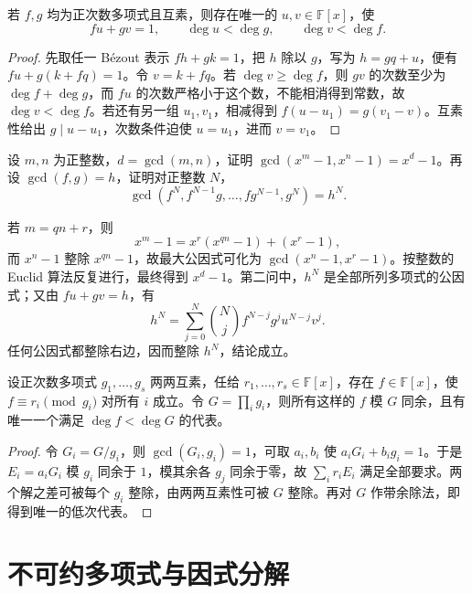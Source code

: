 \begin{proposition}
\label{prop:poly-reduced-bezout}
若 $f,g$ 均为正次数多项式且互素，则存在唯一的 $u,v\in\mathbb F[x]$，使
\[
    fu+gv=1,\qquad \deg u<\deg g,\qquad \deg v<\deg f.
\]
\end{proposition}
\begin{proof}
先取任一 Bézout 表示 $fh+gk=1$，把 $h$ 除以 $g$，写为 $h=gq+u$，便有 $fu+g(k+fq)=1$。令 $v=k+fq$。若 $\deg v\geq\deg f$，则 $gv$ 的次数至少为 $\deg f+\deg g$，而 $fu$ 的次数严格小于这个数，不能相消得到常数，故 $\deg v<\deg f$。若还有另一组 $u_1,v_1$，相减得到 $f(u-u_1)=g(v_1-v)$。互素性给出 $g\mid u-u_1$，次数条件迫使 $u=u_1$，进而 $v=v_1$。
\end{proof}

\begin{example}
\label{ex:poly-gcd-powers}
设 $m,n$ 为正整数，$d=\gcd(m,n)$，证明 $\gcd(x^m-1,x^n-1)=x^d-1$。再设 $\gcd(f,g)=h$，证明对正整数 $N$，
\[
    \gcd(f^N,f^{N-1}g,\ldots,fg^{N-1},g^N)=h^N.
\]
\end{example}
\begin{solve}
若 $m=qn+r$，则
\[
    x^m-1=x^r(x^{qn}-1)+(x^r-1),
\]
而 $x^n-1$ 整除 $x^{qn}-1$，故最大公因式可化为 $\gcd(x^n-1,x^r-1)$。按整数的 Euclid 算法反复进行，最终得到 $x^d-1$。第二问中，$h^N$ 是全部所列多项式的公因式；又由 $fu+gv=h$，有
\[
    h^N=\sum_{j=0}^N\binom Nj f^{N-j}g^ju^{N-j}v^j.
\]
任何公因式都整除右边，因而整除 $h^N$，结论成立。
\end{solve}

\begin{theorem}[多项式的中国剩余定理]
\label{thm:poly-crt}
设正次数多项式 $g_1,\ldots,g_s$ 两两互素，任给 $r_1,\ldots,r_s\in\mathbb F[x]$，存在 $f\in\mathbb F[x]$，使 $f\equiv r_i\pmod{g_i}$ 对所有 $i$ 成立。令 $G=\prod_i g_i$，则所有这样的 $f$ 模 $G$ 同余，且有唯一一个满足 $\deg f<\deg G$ 的代表。
\end{theorem}
\begin{proof}
令 $G_i=G/g_i$，则 $\gcd(G_i,g_i)=1$，可取 $a_i,b_i$ 使 $a_iG_i+b_ig_i=1$。于是 $E_i=a_iG_i$ 模 $g_i$ 同余于 $1$，模其余各 $g_j$ 同余于零，故 $\sum_i r_iE_i$ 满足全部要求。两个解之差可被每个 $g_i$ 整除，由两两互素性可被 $G$ 整除。再对 $G$ 作带余除法，即得到唯一的低次代表。
\end{proof}

\section{不可约多项式与因式分解}
\label{sec:poly-factorization}

